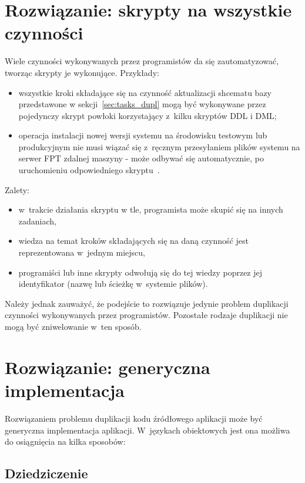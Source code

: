\section{Rozwiązanie: skrypty na wszystkie czynności}

Wiele czynności wykonywanych przez programistów da się zautomatyzować, tworząc skrypty je wykonujące.
Przykłady:

\begin{itemize}
 \item wszystkie kroki składające się na czynność aktualizacji shcematu bazy przedstawone w sekcji~\ref{sec:tasks_dupl} mogą być wykonywane przez pojedynczy skrypt powłoki korzystający z~kilku skryptów DDL i DML;
 \item operacja instalacji nowej wersji systemu na środowisku testowym lub produkcyjnym nie musi wiązać się z~ręcznym przesyłaniem plików systemu na serwer FPT zdalnej maszyny - może odbywać się automatycznie, po uruchomieniu odpowiedniego skryptu~\cite{cont_delivery}.
\end{itemize}

Zalety:

\begin{itemize}
 \item w~trakcie działania skryptu w tle, programista może skupić się na innych zadaniach,
 \item wiedza na temat kroków składających się na daną czynność jest reprezentowana w~jednym miejscu,
 \item programiści lub inne skrypty odwołują się do tej wiedzy poprzez jej identyfikator (nazwę lub ścieżkę w~systemie plików).
\end{itemize}

Należy jednak zauważyć, że podejście to rozwiązuje jedynie problem duplikacji czynności wykonywanych przez programistów.
Pozostałe rodzaje duplikacji nie mogą być zniwelowanie w~ten sposób.



\section{Rozwiązanie: generyczna implementacja}

Rozwiązaniem problemu duplikacji kodu źródłowego aplikacji może być generyczna implementacja aplikacji.
W~językach obiektowych jest ona możliwa do osiągnięcia na kilka sposobów:


\subsection{Dziedziczenie}

